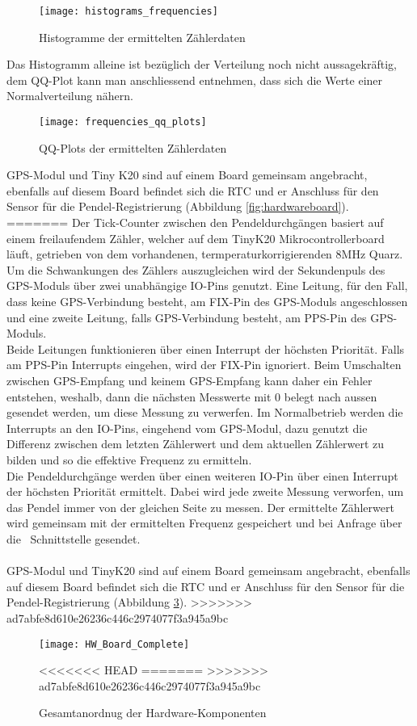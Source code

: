 	\begin{figure}[H]
		\centering
		\texttt{[image: histograms\_frequencies]}
		\caption{Histogramme der ermittelten Zählerdaten}
		\label{fig:freq_histograms}
	\end{figure}
	Das Histogramm alleine ist bezüglich der Verteilung noch nicht aussagekräftig, dem QQ-Plot kann man anschliessend entnehmen, dass sich die Werte einer Normalverteilung nähern.
	\begin{figure}[H]
		\centering
		\texttt{[image: frequencies\_qq\_plots]}
		\caption{QQ-Plots der ermittelten Zählerdaten}
		\label{fig:freq_qq_plot}
	\end{figure}
GPS-Modul und Tiny K20 sind auf einem Board gemeinsam angebracht, ebenfalls auf diesem Board befindet sich die RTC und er Anschluss für den Sensor für die Pendel-Registrierung (Abbildung \ref{fig:hardwareboard}).
=======
Der Tick-Counter zwischen den Pendeldurchgängen basiert auf einem freilaufendem Zähler, welcher auf dem TinyK20 Mikrocontrollerboard läuft, getrieben von dem vorhandenen, termperaturkorrigierenden 8MHz Quarz.
Um die Schwankungen des Zählers auszugleichen wird der Sekundenpuls des GPS-Moduls über zwei unabhängige IO-Pins genutzt. Eine Leitung, für den Fall, dass keine GPS-Verbindung besteht, am FIX-Pin des GPS-Moduls angeschlossen und eine zweite Leitung, falls GPS-Verbindung besteht, am PPS-Pin des GPS-Moduls.\\
Beide Leitungen funktionieren über einen Interrupt der höchsten Priorität. Falls am PPS-Pin Interrupts eingehen, wird der FIX-Pin ignoriert. Beim Umschalten zwischen GPS-Empfang und keinem GPS-Empfang kann daher ein Fehler entstehen, weshalb, dann die nächsten Messwerte mit 0 belegt nach aussen gesendet werden, um diese Messung zu verwerfen.
Im Normalbetrieb werden die Interrupts an den IO-Pins, eingehend vom GPS-Modul, dazu genutzt die Differenz zwischen dem letzten Zählerwert und dem aktuellen Zählerwert zu bilden und so die effektive Frequenz zu ermitteln.\\ 
Die Pendeldurchgänge werden über einen weiteren IO-Pin über einen Interrupt der höchsten Priorität ermittelt. Dabei wird jede zweite Messung verworfen, um das Pendel immer von der gleichen Seite zu messen. Der ermittelte Zählerwert wird gemeinsam mit der ermittelten Frequenz gespeichert und bei Anfrage über die \iic\ Schnittstelle gesendet.\\
\\
GPS-Modul und TinyK20 sind auf einem Board gemeinsam angebracht, ebenfalls auf diesem Board befindet sich die RTC und er Anschluss für den Sensor für die Pendel-Registrierung (Abbildung \ref{fig:hardware_board}).
>>>>>>> ad7abfe8d610e26236c446c2974077f3a945a9bc
	\begin{figure}[H]
		\centering
		\texttt{[image: HW\_Board\_Complete]}
		\caption{Gesamtanordnug der Hardware-Komponenten}
<<<<<<< HEAD
		\label{fig:hardwareboard}
=======
		\label{fig:hardware_board}
>>>>>>> ad7abfe8d610e26236c446c2974077f3a945a9bc
	\end{figure}